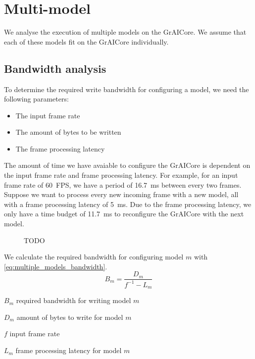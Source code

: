 \section{Multi-model}
We analyse the execution of multiple models on the GrAICore.
We assume that each of these models fit on the GrAICore individually.

\subsection{Bandwidth analysis}

To determine the required write bandwidth for configuring a model, we need the following parameters:
\begin{itemize}
    \item The input frame rate
    \item The amount of bytes to be written
    \item The frame processing latency
\end{itemize}

The amount of time we have avaiable to configure the GrAICore is dependent on the input frame rate and frame processing latency.
For example, for an input frame rate of \SI{60}{FPS}, we have a period of \SI{16.7}{ms} between every two frames.
Suppose we want to process every new incoming frame with a new model, all with a frame processing latency of \SI{5}{ms}. 
Due to the frame processing latency, we only have a time budget of \SI{11.7}{ms} to reconfigure the GrAICore with the next model.

\begin{figure}[htbp]
    \centering
    
    \caption{TODO}
    \label{fig:reconfig_time_line_ex3}
\end{figure}

We calculate the required bandwidth for configuring model $m$ with \cref{eq:multiple_models_bandwidth}.
\begin{equation}
    B_m = \frac{D_m}{f^{-1} - L_m}
    \label{eq:multiple_models_bandwidth}
\end{equation}

\begin{eqexpl}[15mm]
    \item{$B_m$} required bandwidth for writing model $m$
    \item{$D_m$} amount of bytes to write for model $m$
    \item{$f$} input frame rate
    \item{$L_m$} frame processing latency for model $m$
\end{eqexpl}

